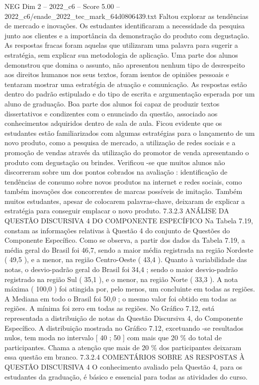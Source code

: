 \begin{textsample}{NEG Dim 2 – 2022\_c6 – Score 5.00 – 2022\_c6/enade\_2022\_tec\_mark\_64d0806439.txt}
Faltou explorar as tendências de mercado e inovações.
Os estudantes identificaram a necessidade da pesquisa junto aos clientes e a importância da demonstração do produto com degustação.
As respostas fracas foram aquelas que utilizaram uma palavra para sugerir a estratégia, sem explicar sua metodologia de aplicação.
Uma parte dos alunos demonstrou que domina o assunto, não apresentou nenhum tipo de desrespeito aos direitos humanos nos seus textos, foram isentos de opiniões pessoais e tentaram mostrar uma estratégia de atuação e comunicação.
As respostas estão dentro do padrão estipulado e do tipo de escrita e argumentação esperada por um aluno de graduação.
Boa parte dos alunos foi capaz de produzir textos dissertativos e condizentes com o enunciado da questão, associado aos conhecimentos adquiridos dentro de sala de aula.
Ficou evidente que os estudantes estão familiarizados com algumas estratégias para o lançamento de um novo produto, como a pesquisa de mercado, a utilização de redes sociais e a promoção de vendas através da utilização do promotor de venda apresentando o produto com degustação ou brindes.
Verificou -se que muitos alunos não discorreram sobre um dos pontos cobrados na avaliação : identificação de tendências de consumo sobre novos produtos na internet e redes sociais, como também inovações dos concorrentes de marcas possíveis de imitação.
Também muitos estudantes, apesar de colocarem palavras-chave, deixaram de explicar a estratégia para conseguir emplacar o novo produto. 7.3.2.3 ANÁLISE DA QUESTÃO DISCURSIVA 4 DO COMPONENTE ESPECÍFICO Na Tabela 7.19, constam as informações relativas à Questão 4 do conjunto de Questões do Componente Específico.
Como se observa, a partir dos dados da Tabela 7.19, a média geral do Brasil foi 46,7, sendo a maior média registrada na região Nordeste ( 49,5 ), e a menor, na região Centro-Oeste ( 43,4 ).
Quanto à variabilidade das notas, o desvio-padrão geral do Brasil foi 34,4 ; sendo o maior desvio-padrão registrado na região Sul ( 35,1 ), e o menor, na região Norte ( 33,3 ).
A nota máxima ( 100,0 ) foi atingida por, pelo menos, um concluinte em todas as regiões.
A Mediana em todo o Brasil foi 50,0 ; o mesmo valor foi obtido em todas as regiões.
A mínima foi zero em todas as regiões.
No Gráfico 7.12, está representada a distribuição de notas da Questão Discursiva 4, do Componente Específico.
A distribuição mostrada no Gráfico 7.12, excetuando -se resultados nulos, tem moda no intervalo [ 40 ; 50 ] com mais que 20 \% do total de participantes.
Chama a atenção que mais de 20 \% dos participantes deixaram essa questão em branco. 7.3.2.4 COMENTÁRIOS SOBRE AS RESPOSTAS À QUESTÃO DISCURSIVA 4 O conhecimento avaliado pela Questão 4, para os estudantes da graduação, é básico e essencial para todas as atividades do curso.

\end{textsample}
